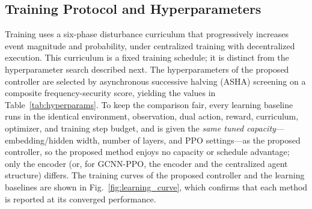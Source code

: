 \documentclass[lettersize,journal]{IEEEtran}
\begin{document}
\begin{table}[!h]
\caption{Baselines and Isolated Component}
\label{tab:methods}
\centering
\footnotesize
{}
\end{table}
\subsection{Training Protocol and Hyperparameters}
\label{sec:casestudy:training}

Training uses a six-phase disturbance curriculum that progressively increases event magnitude and probability, under centralized training with decentralized execution. This curriculum is a fixed training schedule; it is distinct from the hyperparameter search described next. The hyperparameters of the proposed controller are selected by asynchronous successive halving (ASHA) screening on a composite frequency-security score, yielding the values in Table~\ref{tab:hyperparams}. To keep the comparison fair, every learning baseline runs in the identical environment, observation, dual action, reward, curriculum, optimizer, and training step budget, and is given the \emph{same tuned capacity}---embedding/hidden width, number of layers, and PPO settings---as the proposed controller, so the proposed method enjoys no capacity or schedule advantage; only the encoder (or, for GCNN-PPO, the encoder and the centralized agent structure) differs. The training curves of the proposed controller and the learning baselines are shown in Fig.~\ref{fig:learning_curve}, which confirms that each method is reported at its converged performance.
\end{document}
